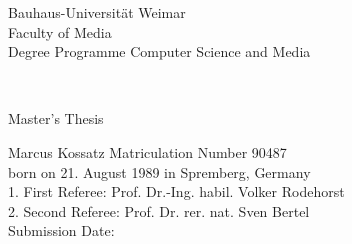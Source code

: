 
\begin{titlepage}

Bauhaus-Universität Weimar \\
Faculty of Media \\
Degree Programme Computer Science and Media \\

\vspace{4.5cm}

\begin{center}
  {\huge \titleFirst} \\[0.5cm]
  {\huge \titleSecond}
\end{center}

\vspace{2.5cm}

{\LARGE Master's Thesis}

\vspace{3.5cm}

Marcus Kossatz \hfill Matriculation Number 90487 \\
born on 21. August 1989 in Spremberg, Germany \\

1. First Referee: Prof. Dr.-Ing. habil. Volker Rodehorst \\
2. Second Referee: Prof. Dr. rer. nat. Sven Bertel \\

Submission Date: \submissionDate

\end{titlepage}
